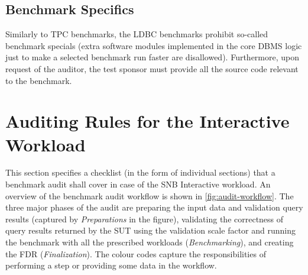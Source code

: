 \subsection{Benchmark Specifics}

Similarly to TPC benchmarks, the LDBC benchmarks prohibit so-called benchmark specials (\ie extra software modules implemented in the core DBMS logic just to make a selected benchmark run faster are disallowed). Furthermore, upon request of the auditor, the test sponsor must provide all the source code relevant to the benchmark.


\section{Auditing Rules for the Interactive Workload}


This section specifies a checklist (in the form of individual sections) that a benchmark audit shall cover in case of the SNB Interactive workload. An overview of the benchmark audit workflow is shown in \autoref{fig:audit-workflow}. The three major phases of the audit are preparing the input data and validation query results (captured by \emph{Preparations} in the figure), validating the correctness of query results returned by the SUT using the validation scale factor and running the benchmark with all the prescribed workloads (\emph{Benchmarking}), and creating the FDR (\emph{Finalization}). The colour codes capture the responsibilities of performing a step or providing some data in the workflow.

